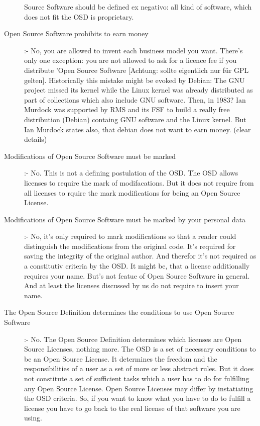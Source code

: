 \begin{description}
  Source Software should be defined ex negativo: all kind of software, which
  does not fit the OSD is proprietary.
  \item[Open Source Software prohibits to earn money] :- No,
  you are allowed to invent each business model you want. There's only one
  exception: you are not allowed to ask for a licence fee if you distribute
  'Open Source Software [Achtung: sollte eigentlich nur für GPL gelten].
  Historically this mistake might be evoked by Debian: The GNU project missed
  its kernel while the Linux kernel was already distributed as part of
  collections which also include GNU software. Then, in 1983? Ian Murdock was
  supported by RMS and its FSF to build a really free distribution (Debian)
  containg GNU software and the Linux kernel. But Ian Murdock states also, that
  debian does not want to earn money. (clear details)
  \item[Modifications of Open Source Software must be marked] :- No. This is not
  a defining postulation of the OSD. The OSD allows licenses to require the mark
  of modifacations. But it does not require from all licenses to rquire the mark
  modifications for being an Open Source License.
  \item[Modifications of Open Source Software must be marked by your personal
  data] :- No, it's only required to mark modifications so that a reader could
  distinguish the modifications from the original code. It's required for saving
  the integrity of the original author. And therefor it's not required as a
  constitutiv criteria by the OSD. It might be, that a license additionally
  requires your name. But's not featue of Open Source Software in general. And
  at least the licenses discussed by us do not require to insert your name.
  \item[The Open Source Definition determines the conditions to use Open Source
  Software] :- No. The Open Source Definition determines which licenses are Open
  Source Licenses, nothing more. The OSD is a set of necessary conditions to be
  an Open Source License. It determines the freedom and the responsibilities of
  a user as a set of more or less abstract rules. But it does not constitute a
  set of sufficient tasks which a user has to do for fulfilling any Open Source
  License. Open Source Licenses may differ by instatiating the OSD criteria.
  So, if you want to know what you have to do to fulfill a license you have to
  go back to the real license of that software you are using.
\end{description}

%
